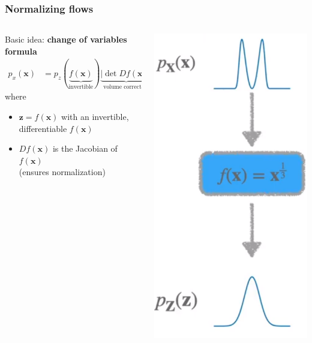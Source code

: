 \documentclass[10pt,aspectratio=169]{beamer}
\begin{document}
\begin{frame}
  \frametitle{Normalizing flows}
\begin{columns}
\begin{column}{.6\textwidth}

\small{
Basic idea: \textbf{change of variables formula} 
\begin{align*}
p_x(\mathbf{x}) & = p_z( \underbrace{f(\mathbf{x})}_{\text{invertible}})\underbrace{| \det Df(\mathbf{x}) |}_{\text{volume correction}
}\end{align*}
where
\begin{itemize}
\item $\mathbf{z}=f(\mathbf{x})$ with an invertible, differentiable $f(\mathbf{x})$
\item $Df(\mathbf{x})$ is the Jacobian of $f(\mathbf{x})$ \\
(ensures normalization)
\end{itemize}
}
\end{column}
\begin{column}{.4\textwidth}
\begin{center}
\includegraphics[width=.6\textwidth]{images/inv}
\end{center}
\end{column}
\end{columns}
\end{frame}
\end{document}
